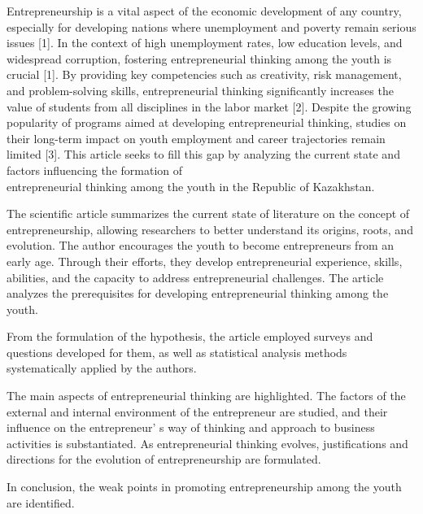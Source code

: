 Entrepreneurship is a vital aspect of the economic development of any
country, especially for developing nations where unemployment and
poverty remain serious issues {[}1{]}. In the context of high
unemployment rates, low education levels, and widespread corruption,
fostering entrepreneurial thinking among the youth is crucial {[}1{]}.
By providing key competencies such as creativity, risk management, and
problem-solving skills, entrepreneurial thinking significantly increases
the value of students from all disciplines in the labor market {[}2{]}.
Despite the growing popularity of programs aimed at developing
entrepreneurial thinking, studies on their long-term impact on youth
employment and career trajectories remain limited {[}3{]}. This article
seeks to fill this gap by analyzing the current state and factors
influencing the formation of \\entrepreneurial thinking among the youth in
the Republic of Kazakhstan.

The scientific article summarizes the current state of literature on the
concept of entrepreneurship, allowing researchers to better understand
its origins, roots, and evolution. The author encourages the youth to
become entrepreneurs from an early age. Through their efforts, they
develop entrepreneurial experience, skills, abilities, and the capacity
to address entrepreneurial challenges. The article analyzes the
prerequisites for developing entrepreneurial thinking among the youth.

From the formulation of the hypothesis, the article employed surveys and
questions developed for them, as well as statistical analysis methods
systematically applied by the authors.

The main aspects of entrepreneurial thinking are highlighted. The
factors of the external and internal environment of the entrepreneur are
studied, and their influence on the entrepreneur' s way
of thinking and approach to business activities is substantiated. As
entrepreneurial thinking evolves, justifications and directions for the
evolution of entrepreneurship are formulated.

In conclusion, the weak points in promoting entrepreneurship among the
youth are identified.

